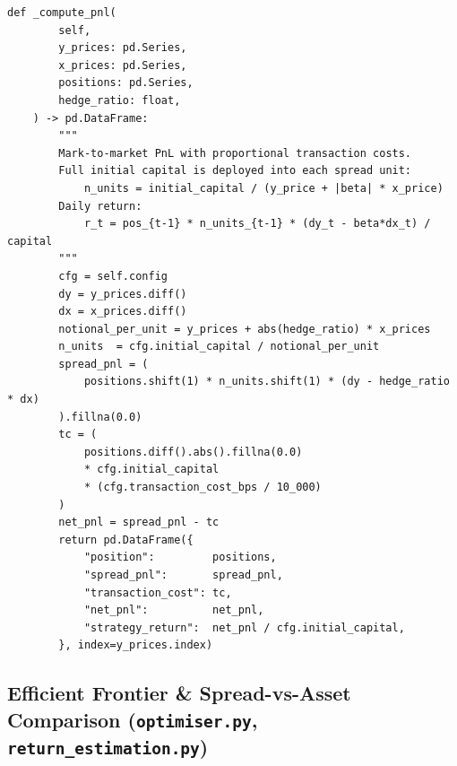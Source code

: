 \documentclass[a4paper]{report}
\begin{document}
\begin{Verbatim}[fontsize=\footnotesize, baselinestretch=0.85]
    def _compute_pnl(
        self,
        y_prices: pd.Series,
        x_prices: pd.Series,
        positions: pd.Series,
        hedge_ratio: float,
    ) -> pd.DataFrame:
        """
        Mark-to-market PnL with proportional transaction costs.
        Full initial capital is deployed into each spread unit:
            n_units = initial_capital / (y_price + |beta| * x_price)
        Daily return:
            r_t = pos_{t-1} * n_units_{t-1} * (dy_t - beta*dx_t) / capital
        """
        cfg = self.config
        dy = y_prices.diff()
        dx = x_prices.diff()
        notional_per_unit = y_prices + abs(hedge_ratio) * x_prices
        n_units  = cfg.initial_capital / notional_per_unit
        spread_pnl = (
            positions.shift(1) * n_units.shift(1) * (dy - hedge_ratio * dx)
        ).fillna(0.0)
        tc = (
            positions.diff().abs().fillna(0.0)
            * cfg.initial_capital
            * (cfg.transaction_cost_bps / 10_000)
        )
        net_pnl = spread_pnl - tc
        return pd.DataFrame({
            "position":         positions,
            "spread_pnl":       spread_pnl,
            "transaction_cost": tc,
            "net_pnl":          net_pnl,
            "strategy_return":  net_pnl / cfg.initial_capital,
        }, index=y_prices.index)
\end{Verbatim}

\subsection{Efficient Frontier \& Spread-vs-Asset Comparison (\texttt{optimiser.py}, \texttt{return\_estimation.py})}
\end{document}
